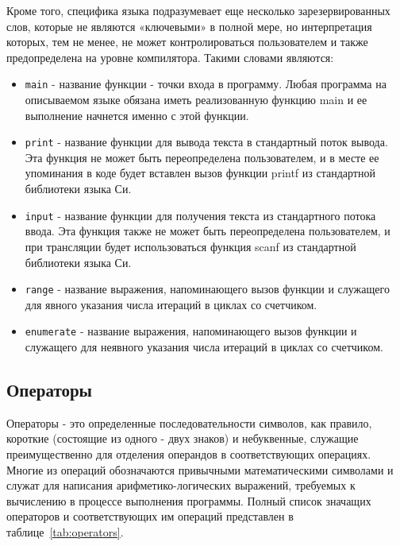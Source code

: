 Кроме того, специфика языка подразумевает еще несколько зарезервированных слов, которые не являются «ключевыми» в полной мере, но интерпретация которых, тем не менее, не может контролироваться пользователем и также предопределена на уровне компилятора.
Такими словами являются:

\begin{itemize}
    \item \verb|main| - название функции - точки входа в программу. Любая программа на описываемом языке обязана иметь реализованную функцию main и ее выполнение начнется именно с этой функции.
    \item \verb|print| - название функции для вывода текста в стандартный поток вывода. Эта функция не может быть переопределена пользователем, и в месте ее упоминания в коде будет вставлен вызов функции printf из стандартной библиотеки языка Си.
    \item \verb|input| - название функции для получения текста из стандартного потока ввода. Эта функция также не может быть переопределена пользователем, и при трансляции будет использоваться функция scanf из стандартной библиотеки языка Си.
    \item \verb|range| - название выражения, напоминающего вызов функции и служащего для явного указания числа итераций в циклах со счетчиком.
    \item \verb|enumerate| - название выражения, напоминающего вызов функции и служащего для неявного указания числа итераций в циклах со счетчиком.
\end{itemize}

\subsection{Операторы}
\label{sec:operators}

Операторы - это определенные последовательности символов, как правило, короткие (состоящие из одного - двух знаков) и небуквенные, служащие преимущественно для отделения операндов в соответствующих операциях.
Многие из операций обозначаются привычными математическими символами и служат для написания арифметико-логических выражений, требуемых к вычислению в процессе выполнения программы.
Полный список значащих операторов и соответствующих им операций представлен в таблице~\ref{tab:operators}.

